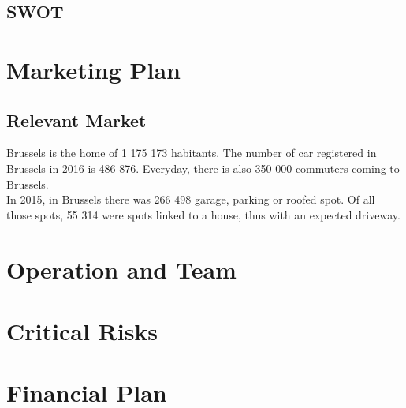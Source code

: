 \documentclass[12pt,a4paper,oneside]{book}
\begin{document}
\section{SWOT}

\chapter{Marketing Plan}

\section{Relevant Market}
Brussels is the home of 1 175 173\cite{ciafb} habitants. The number of car registered in Brussels in 2016 is 486 876.\cite{mtvr} Everyday, there is also 350 000 commuters coming to Brussels.\cite{bxcommu}\\
In 2015, in Brussels there was 266 498 garage, parking or roofed spot. Of all those spots, 55 314 were spots linked to a house, thus with an expected driveway.\cite{atpb}
\chapter{Operation and Team}

\chapter{Critical Risks}

\chapter{Financial Plan}



%

\end{document}
